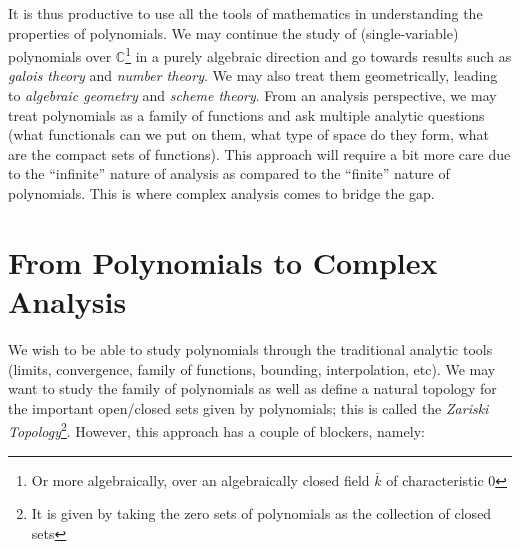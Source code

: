 \documentclass{article}
\newcommand{\C}{\mathbb{C}}
\newcommand{\oln}{\overline}
\begin{document}
It is thus productive to use all the tools of mathematics in understanding the properties of polynomials. We
may continue the study of (single-variable) polynomials over $\C$\footnote{Or more algebraically, over an algebraically closed
field $\oln{k}$ of characteristic $0$} in a purely algebraic direction and go towards results such as
\emph{galois theory} and \emph{number theory}. We may also treat them geometrically, leading to \emph{algebraic
geometry} and \emph{scheme theory}. From an analysis perspective, we may treat polynomials as a family of
functions and ask multiple analytic questions (what functionals can we put on them, what type of space do they
form, what are the compact sets of functions). This approach will require a bit more care due to the
``infinite'' nature of analysis as compared to the ``finite'' nature of polynomials. This is where complex
analysis comes to bridge the gap.


\section{From Polynomials to Complex Analysis}

We wish to be able to study polynomials through the traditional analytic tools (limits, convergence, family of
functions, bounding, interpolation, etc). We may want to study the family of polynomials as well as define a
natural topology for the important open/closed sets given by polynomials; this is called the
\emph{Zariski Topology}\footnote{It is given by taking the zero sets of polynomials as the collection of
closed sets}. However, this approach has a couple of blockers, namely:
\end{document}
